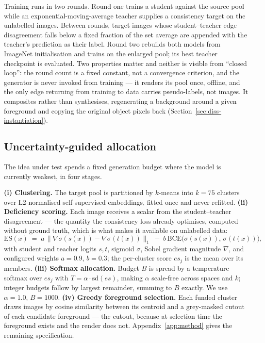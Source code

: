 \documentclass{article} %
\begin{document}
Training runs in two rounds. Round one trains a student against the source pool while an
exponential-moving-average teacher supplies a consistency target on the unlabelled images. Between
rounds, target images whose student--teacher edge disagreement falls below a fixed fraction of the set
average are appended with the teacher's prediction as their label. Round two rebuilds both models from
ImageNet initialisation and trains on the enlarged pool; its best teacher checkpoint is evaluated.
Two properties matter and neither is visible from ``closed loop'': the round count is a fixed constant,
not a convergence criterion, and the generator is never invoked from training --- it renders its pool
once, offline, and the only edge returning from training to data carries pseudo-labels, not images. It
composites rather than synthesises, regenerating a background around a given foreground and copying
the original object pixels back (Section~\ref{sec:diss-instantiation}).

\subsection{Uncertainty-guided allocation}
\label{sec:method-allocation}

The idea under test spends a fixed generation budget where the model is currently weakest, in four
stages.

\textbf{(i) Clustering.} The target pool is partitioned by $k$-means into $k=75$ clusters over
L2-normalised self-supervised embeddings, fitted once and never refitted. \textbf{(ii) Deficiency
scoring.} Each image receives a scalar from the student--teacher disagreement --- the quantity the
consistency loss already optimises, computed without ground truth, which is what makes it available on
unlabelled data:
\begin{equation}
\mathrm{ES}(x) \;=\; a \,\big\| \nabla \sigma(s(x)) - \nabla \sigma(t(x)) \big\|_{1}
\;+\; b \, \mathrm{BCE}\big( \sigma(s(x)),\, \sigma(t(x)) \big),
\label{eq:es}
\end{equation}
with student and teacher logits $s,t$, sigmoid $\sigma$, Sobel gradient magnitude $\nabla$, and
configured weights $a=0.9$, $b=0.3$; the per-cluster score $\mathit{es}_j$ is the mean over its
members. \textbf{(iii) Softmax allocation.} Budget $B$ is spread by a temperature softmax over
$\mathit{es}_j$ with $T = \alpha \cdot \mathrm{sd}(\mathit{es})$, making $\alpha$ scale-free across
spaces and $k$; integer budgets follow by largest remainder, summing to $B$ exactly. We use
$\alpha = 1.0$, $B = 1000$. \textbf{(iv) Greedy foreground selection.} Each funded cluster draws images
by cosine similarity between its centroid and a grey-masked cutout of each candidate foreground --- the
cutout, because at selection time the foreground exists and the render does not.
Appendix~\ref{app:method} gives the remaining specification.
\end{document}
